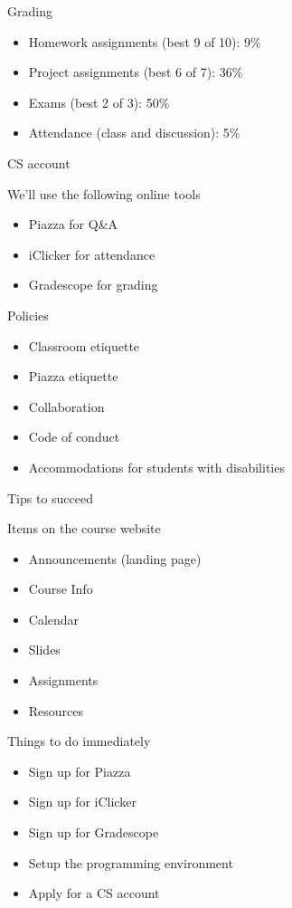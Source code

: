 \documentclass[8pt,a4paper,compress]{beamer}
\begin{document}
\begin{frame}[fragile]
\pause

Grading
\begin{itemize}
\item Homework assignments (best 9 of 10): 9\%
\item Project assignments (best 6 of 7): 36\%
\item Exams (best 2 of 3): 50\%
\item Attendance (class and discussion): 5\%
\end{itemize}

\pause
\bigskip

CS account

\pause
\bigskip

We'll use the following online tools
\begin{itemize}
\item Piazza for Q\&A
\item iClicker for attendance
\item Gradescope for grading
\end{itemize}

\pause
\bigskip

Policies
\begin{itemize}
\item Classroom etiquette
\item Piazza etiquette
\item Collaboration
\item Code of conduct
\item Accommodations for students with disabilities
\end{itemize}

\pause
\bigskip

Tips to succeed
\end{frame}

\begin{frame}[fragile]
\pause

Items on the course website
\begin{itemize}
\item Announcements (landing page)
\item Course Info
\item Calendar
\item Slides 
\item Assignments
\item Resources
\end{itemize}

\pause
\bigskip

Things to do immediately
\begin{itemize}
\item Sign up for Piazza
\item Sign up for iClicker
\item Sign up for Gradescope
\item Setup the programming environment
\item Apply for a CS account
\end{itemize}
\end{frame}
\end{document}
